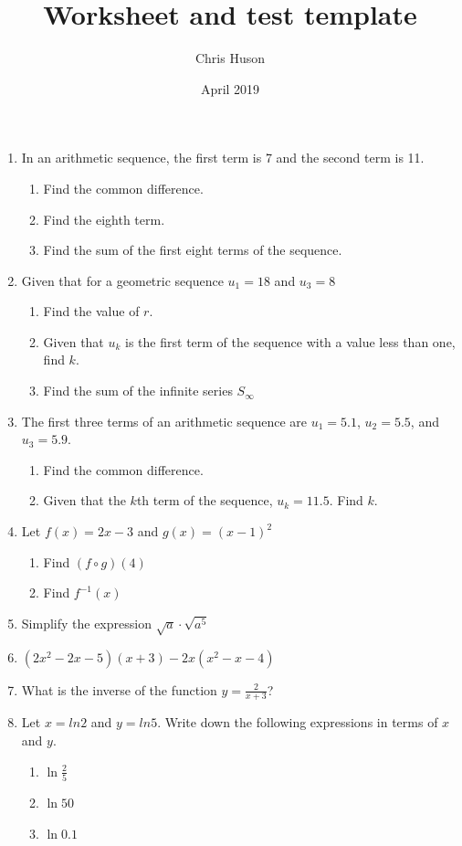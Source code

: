 \documentclass[12pt, oneside]{article}
\title{Worksheet and test template}
\author{Chris Huson}
\date{April 2019}
\begin{document}
\begin{enumerate}
\item In an arithmetic sequence, the first term is 7 and the second term is 11.
\begin{enumerate}
    \item Find the common difference.
    \item Find the eighth term.
    \item Find the sum of the first eight terms of the sequence.
\end{enumerate}

\item Given that for a geometric sequence $u_1=18$ and $u_3=8$
\begin{enumerate}
    \item Find the value of $r$.
    \item Given that $u_k$ is the first term of the sequence with a value less than one, find $k$.
    \item Find the sum of the infinite series $S_\infty$
\end{enumerate}

\item The first three terms of an arithmetic sequence are $u_1=5.1$, $u_2=5.5$, and $u_3=5.9$.
\begin{enumerate}
    \item Find the common difference.
    \item Given that the $k$th term of the sequence, $u_k=11.5$. Find $k$.
\end{enumerate}

\item Let $f(x) = 2x -3$ and $g(x)=(x-1)^2$
\begin{enumerate}
    \item Find $(f \circ g)(4)$
    \item Find $f^{-1}(x)$
\end{enumerate}

\item Simplify the expression $\sqrt{a} \cdot \sqrt{a^5}$

\item $(2x^2-2x-5)(x+3)-2x(x^2-x-4)$

\item What is the inverse of the function $y=\frac{2}{x+3}$?

\item Let $x=ln2$ and $y=ln5$. Write down the following expressions in terms of $x$ and $y$.
\begin{enumerate}
    \item $\ln \frac{2}{5}$
    \item $\ln 50$
    \item $\ln 0.1$
\end{enumerate}


\end{enumerate}
\end{document}
